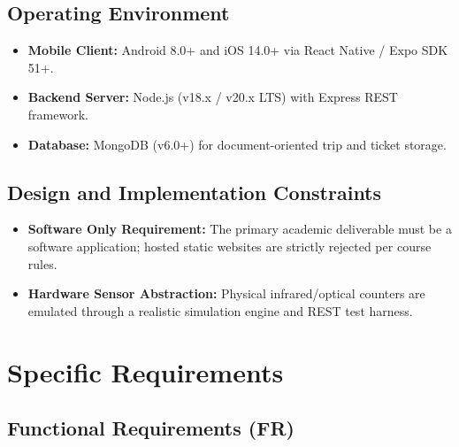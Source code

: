 \documentclass[11pt,a4paper]{article}
\begin{document}
\subsection{Operating Environment}
\begin{itemize}[noitemsep]
    \item \textbf{Mobile Client:} Android 8.0+ and iOS 14.0+ via React Native / Expo SDK 51+.
    \item \textbf{Backend Server:} Node.js (v18.x / v20.x LTS) with Express REST framework.
    \item \textbf{Database:} MongoDB (v6.0+) for document-oriented trip and ticket storage.
\end{itemize}

\subsection{Design and Implementation Constraints}
\begin{itemize}[noitemsep]
    \item \textbf{Software Only Requirement:} The primary academic deliverable must be a software application; hosted static websites are strictly rejected per course rules.
    \item \textbf{Hardware Sensor Abstraction:} Physical infrared/optical counters are emulated through a realistic simulation engine and REST test harness.
\end{itemize}

\section{Specific Requirements}

\subsection{Functional Requirements (FR)}
\end{document}
